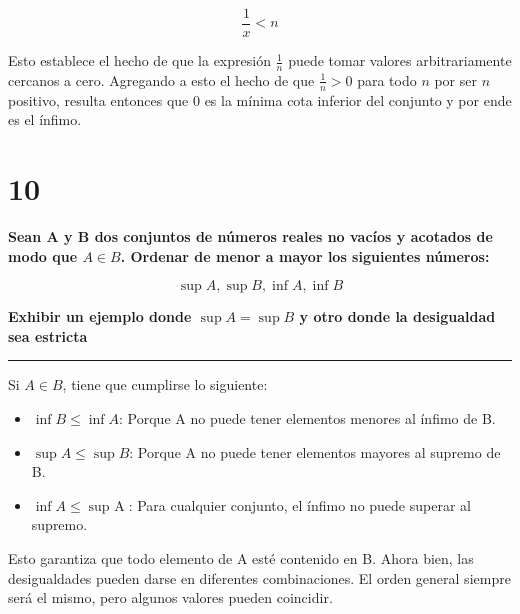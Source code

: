 \documentclass{article}
\newcommand{\sectionx}[1]{\section*{#1}\label{sec:#1}\addcontentsline{toc}{section}{\nameref{sec:#1}}}
\begin{document}
\begin{equation}
\frac{1}{x} < n
\end{equation}

Esto establece el hecho de que la expresión $ \frac{1}{n} $ puede tomar valores arbitrariamente cercanos a cero. Agregando a esto el hecho de que $ \frac{1}{n} > 0 $ para todo $ n $ por ser $ n $ positivo, resulta entonces que 0 es la mínima cota inferior del conjunto y por ende es el ínfimo.

\sectionx{10}

\textbf{Sean A y B dos conjuntos de números reales no vacíos y acotados de modo que $ A \in B $. Ordenar de menor a mayor los siguientes números:}

\begin{equation}
\mathop{\text{sup}} A, \mathop{\text{sup}} B, \mathop{\text{inf}} A, \mathop{\text{inf}} B
\end{equation}

\textbf{Exhibir un ejemplo donde $ \mathop{\text{sup}} A = \mathop{\text{sup}} B $ y otro donde la desigualdad sea estricta}

\vspace{1em}
\hrule
\vspace{1em}

Si $ A \in B $, tiene que cumplirse lo siguiente:

\begin{itemize}
\item $ \mathop{\text{inf}} B \leq \mathop{\text{inf}} A $: Porque A no puede tener elementos menores al ínfimo de B. 
\item $ \mathop{\text{sup}} A \leq \mathop{\text{sup}} B $: Porque A no puede tener elementos mayores al supremo de B.
\item $ \mathop{\text{inf}} A \leq \mathop{\text{sup A}} $: Para cualquier conjunto, el ínfimo no puede superar al supremo.
\end{itemize}

Esto garantiza que todo elemento de A esté contenido en B. Ahora bien, las desigualdades pueden darse en diferentes combinaciones. El orden general siempre será el mismo, pero algunos valores pueden coincidir.
\end{document}
